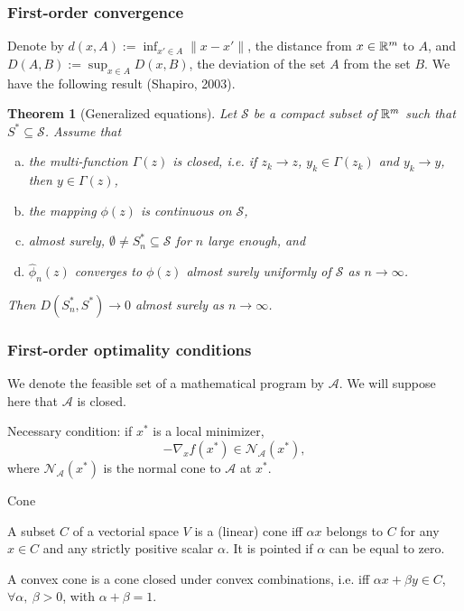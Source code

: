 \documentclass{beamer}
\newtheorem{theo}{Theorem}
\newcommand{\tim}[1]{\;\; \mbox{#1} \;\;}
\begin{document}
\begin{frame}
\frametitle{First-order convergence}

Denote by $d(x,A) := \inf_{x' \in A} \| x - x' \|$, the distance from $x \in \mathbb{R}^m$ to $A$, and $D(A,B) := \sup_{x \in A} D(x, B)$, the deviation of the set $A$ from the set $B$.
We have the following result (Shapiro, 2003).
\begin{theo}[Generalized equations]
Let $\mathcal{S}$ be a compact subset of $\mathbb{R}^m$ such that $S^* \subseteq \mathcal{S}$.
Assume that
\begin{enumerate}[(a)]
\item
the multi-function $\Gamma(z)$ is closed, i.e. if $z_k \rightarrow z$, $y_k \in \Gamma(z_k)$ and $y_k \rightarrow y$, then $y \in \Gamma(z)$,
\item
the mapping $\phi(z)$ is continuous on $\mathcal{S}$,
\item 
almost surely, $\emptyset \neq S^*_n \subseteq \mathcal{S}$ for $n$ large enough, and
\item
$\hat{\phi}_n(z)$ converges to $\phi(z)$ almost surely uniformly of $\mathcal{S}$ as $n \rightarrow \infty$.
\end{enumerate}
Then $D(S^*_n, S^*) \rightarrow 0$ almost surely as $n \rightarrow \infty$.
\label{th:svi}
\end{theo}

\end{frame}

\begin{frame}
\frametitle{First-order optimality conditions}

We denote the feasible set of a mathematical program by $\mathcal{A}$.
We will suppose here that $\mathcal{A}$ is closed.

\mbox{}

{\red Necessary condition}: if $x^*$ is a local minimizer,
\[
-\nabla_x f(x^*) \in \mathcal{N}_{\mathcal{A}}(x^*),
\]
where $\mathcal{N}_{\mathcal{A}}(x^*)$ is the normal cone to $\mathcal{A}$ at $x^*$.

\mbox{}

{\blue Cone}

\mbox
 
A subset $C$ of a vectorial space $V$ is a (linear) {\red cone}
iff $\alpha x$ belongs to $C$ for any $x \in C$ and any strictly positive scalar $\alpha$.
It is pointed if $\alpha$ can be equal to zero.

\mbox{}

A {\red convex cone} is a cone closed under convex combinations, i.e. iff $\alpha x + \beta y \in C$, $\forall \alpha,\ \beta > 0$, with $\alpha + \beta = 1$.

\end{frame}
\end{document}
